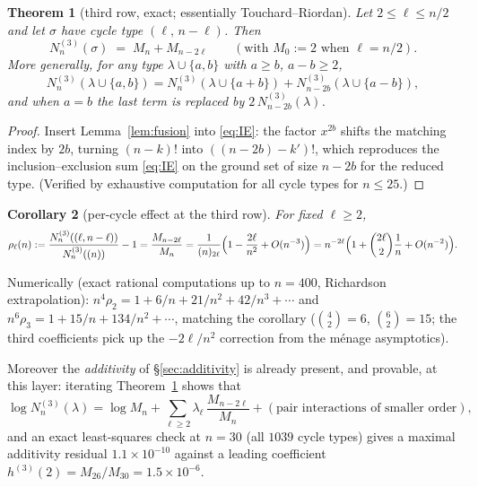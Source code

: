 \documentclass[11pt]{article}
\newtheorem{theorem}{Theorem}[section]
\newtheorem{corollary}[theorem]{Corollary}
\theoremstyle{definition}
\begin{document}
\begin{theorem}[third row, exact; essentially Touchard--Riordan]\label{thm:thirdrow}
Let $2\le\ell\le n/2$ and let $\sigma$ have cycle type $(\ell,\,n-\ell)$.
Then
\[
N^{(3)}_n(\sigma)\;=\;M_n+M_{n-2\ell}
\qquad(\text{with }M_0:=2\text{ when }\ell=n/2).
\]
More generally, for any type $\lambda\cup\{a,b\}$ with $a\ge b$, $a-b\ge2$,
\[
N^{(3)}_n(\lambda\cup\{a,b\})
=N^{(3)}_n(\lambda\cup\{a+b\})
+N^{(3)}_{n-2b}(\lambda\cup\{a-b\}),
\]
and when $a=b$ the last term is replaced by
$2\,N^{(3)}_{n-2b}(\lambda)$.
\end{theorem}

\begin{proof}
Insert Lemma~\ref{lem:fusion} into \eqref{eq:IE}: the factor $x^{2b}$ shifts
the matching index by $2b$, turning $(n-k)!$ into $((n-2b)-k')!$, which
reproduces the inclusion--exclusion sum \eqref{eq:IE} on the ground set of
size $n-2b$ for the reduced type.  (Verified by exhaustive computation for
all cycle types for $n\le25$.)
\end{proof}

\begin{corollary}[per-cycle effect at the third row]\label{cor:thirdrow}
For fixed $\ell\ge2$,
\[
\rho_\ell(n):=\frac{N^{(3)}_n((\ell,n-\ell))}{N^{(3)}_n((n))}-1
=\frac{M_{n-2\ell}}{M_n}
=\frac{1}{(n)_{2\ell}}\Bigl(1-\frac{2\ell}{n^2}+O(n^{-3})\Bigr)
=n^{-2\ell}\Bigl(1+\binom{2\ell}{2}\frac1n+O(n^{-2})\Bigr).
\]
\end{corollary}

Numerically (exact rational computations up to $n=400$, Richardson
extrapolation): $n^4\rho_2 = 1+6/n+21/n^2+42/n^3+\cdots$ and
$n^6\rho_3=1+15/n+134/n^2+\cdots$, matching the corollary
($\binom42=6$, $\binom62=15$; the third coefficients pick up the
$-2\ell/n^2$ correction from the m\'enage asymptotics).

Moreover the \emph{additivity} of \S\ref{sec:additivity} is already present,
and provable, at this layer: iterating Theorem~\ref{thm:thirdrow} shows that
\[
\log N^{(3)}_n(\lambda)=\log M_n+\sum_{\ell\ge2}\lambda_\ell\,
\frac{M_{n-2\ell}}{M_n}+(\text{pair interactions of smaller order}),
\]
and an exact least-squares check at $n=30$ (all $1039$ cycle types) gives a
maximal additivity residual $1.1\times10^{-10}$ against a leading coefficient
$h^{(3)}(2)=M_{26}/M_{30}=1.5\times10^{-6}$.
\end{document}
